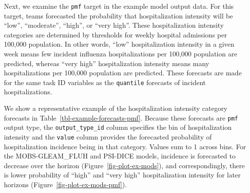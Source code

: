 \documentclass[
  article,
  shortnames,
  notitle]{jss}
\begin{document}
Next, we examine the \texttt{pmf} target in the example model output
data. For this target, teams forecasted the probability that
hospitalization intensity will be ``low'', ``moderate'', ``high'', or
``very high''. These hospitalization intensity categories are determined
by thresholds for weekly hospital admissions per 100,000 population. In
other words, ``low'' hospitalization intensity in a given week means few
incident influenza hospitalizations per 100,000 population are
predicted, whereas ``very high'' hospitalization intensity means many
hospitalizations per 100,000 population are predicted. These forecasts
are made for the same task ID variables as the \texttt{quantile}
forecasts of incident hospitalizations.

We show a representative example of the hospitalization intensity
category forecasts in Table~\ref{tbl-example-forecasts-pmf}. Because
these forecasts are \texttt{pmf} output type, the
\texttt{output\_type\_id} column specifies the bin of hospitalization
intensity and the \texttt{value} column provides the forecasted
probability of hospitalization incidence being in that category. Values
sum to 1 across bins. For the MOBS-GLEAM\_FLUH and PSI-DICE models,
incidence is forecasted to decrease over the horizon
(Figure~\ref{fig-plot-ex-mods}), and correspondingly, there is lower
probability of ``high'' and ``very high'' hospitalization intensity for
later horizons (Figure~\ref{fig-plot-ex-mods-pmf}).
\end{document}
